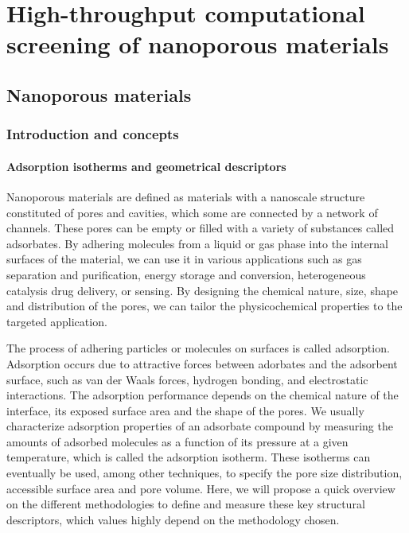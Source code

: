 \documentclass[main.tex]{subfiles}
\begin{document}
\chapter{High-throughput computational screening of nanoporous materials}
\vspace*{-1\baselineskip}

\section{Nanoporous materials}

\subsection{Introduction and concepts}

\subsubsection{Adsorption isotherms and geometrical descriptors}

Nanoporous materials are defined as materials with a nanoscale structure constituted of pores and cavities, which some are connected by a network of channels. These pores can be empty or filled with a variety of substances called adsorbates. By adhering molecules from a liquid or gas phase into the internal surfaces of the material, we can use it in various applications such as gas separation and purification,\cite{Li_2009,Lagorsse_2007} energy storage and conversion,\cite{Morris_2008,Qiu_2020} heterogeneous catalysis\cite{Bell_2003,Singh_2019,Pascanu_2019} drug delivery,\cite{Della_Rocca_2011,Bernini_2014} or sensing.\cite{Breslin_1976} By designing the chemical nature, size, shape and distribution of the pores, we can tailor the physicochemical properties to the targeted application.\cite{Yan_2020}

The process of adhering particles or molecules on surfaces is called adsorption. Adsorption occurs due to attractive forces between adorbates and the adsorbent surface, such as van der Waals forces, hydrogen bonding, and electrostatic interactions. The adsorption performance depends on the chemical nature of the interface, its exposed surface area and the shape of the pores. We usually characterize adsorption properties of an adsorbate compound by measuring the amounts of adsorbed molecules as a function of its pressure at a given temperature, which is called the adsorption isotherm. These isotherms can eventually be used, among other techniques, to specify the pore size distribution, accessible surface area and pore volume.\cite{Rouquerol_1994} Here, we will propose a quick overview on the different methodologies to define and measure these key structural descriptors, which values highly depend on the methodology chosen.
\end{document}
